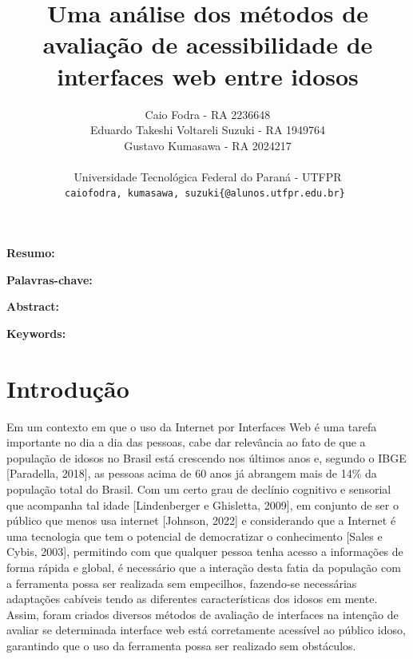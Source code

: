 \documentclass[12pt]{article}
\begin{document}
\title{
    \textbf{Uma análise dos métodos de avaliação de acessibilidade de interfaces web entre idosos}
    }
	    
    \author{
	Caio Fodra - RA 2236648                             \\
	Eduardo Takeshi Voltareli Suzuki - RA 1949764       \\
	Gustavo Kumasawa - RA 2024217                       \\
	\\
	Universidade Tecnológica Federal do Paraná - UTFPR
							    \\  
	\texttt{caiofodra, kumasawa, suzuki\{@alunos.utfpr.edu.br\} }
	}
\date{}
\maketitle 

\textbf{Resumo:}
	        
\textbf{Palavras-chave:}

\textbf{Abstract:}

\textbf{Keywords:}

\section{Introdução}

    Em um contexto em que o uso da Internet por Interfaces Web é uma tarefa importante no dia a dia das pessoas, cabe dar relevância ao fato de que a população de idosos no Brasil está crescendo nos últimos anos e, segundo o IBGE [Paradella, 2018], as pessoas acima de 60 anos já abrangem mais de 14\% da população total do Brasil. Com um certo grau de declínio cognitivo e sensorial que acompanha tal idade [Lindenberger e Ghisletta, 2009], em conjunto de ser o público que menos usa internet [Johnson, 2022] e considerando que a Internet é uma tecnologia que tem o potencial de democratizar o conhecimento [Sales e Cybis, 2003], permitindo com que qualquer pessoa tenha acesso a informações de forma rápida e global, é necessário que a interação desta fatia da população com a ferramenta possa ser realizada sem empecilhos, fazendo-se necessárias adaptações cabíveis tendo as diferentes características dos idosos em mente. Assim, foram criados diversos métodos de avaliação de interfaces na intenção de avaliar se determinada interface web está corretamente acessível ao público idoso, garantindo que o uso da ferramenta possa ser realizado sem obstáculos.
\end{document}
